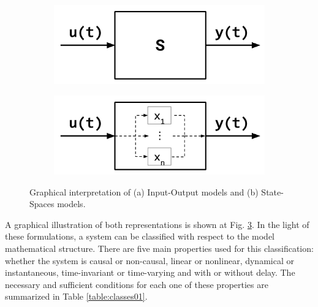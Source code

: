 \documentclass[a4paper,11pt]{book}
\numberwithin{figure}{chapter}
\numberwithin{equation}{chapter}
\numberwithin{table}{chapter}
\theoremstyle{definition}
\begin{document}
\begin{figure}[ht] 
    \centering
    \begin{subfigure}{0.49\textwidth}
        \centering  
        \includegraphics[scale=0.7]{chapter2/model01}
        \caption{}  \label{fig:model01a}
    \end{subfigure}
    \begin{subfigure}{0.49\textwidth}   
    \centering
        \includegraphics[scale=0.7]{chapter2/model02}
        \caption{} \label{fig:model01b}
    \end{subfigure}
    
    \caption{Graphical interpretation of (a) Input-Output models and (b) State-Spaces models.} 
    \label{fig:model1}
\end{figure}

A graphical illustration of both representations is shown at Fig. \ref{fig:model1}. In the light of these formulations, a system can be classified with respect to the model mathematical structure. There are five main properties used for this classification: whether the system is causal or non-causal, linear or nonlinear, dynamical or instantaneous, time-invariant or time-varying and with or without delay. The necessary and sufficient conditions for each one of these properties are summarized in Table \ref{table:classes01}.
\end{document}
